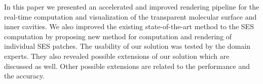 In this paper we presented an accelerated and improved rendering pipeline for the real-time computation and visualization of the transparent molecular surface and inner cavities.
We also improved the existing state-of-the-art method to the SES computation by proposing new method for computation and rendering of individual SES patches.
The usability of our solution was tested by the domain experts. 
They also revealed possible extensions of our solution which are discussed as well.
Other possible extensions are related to the performance and the accuracy.
